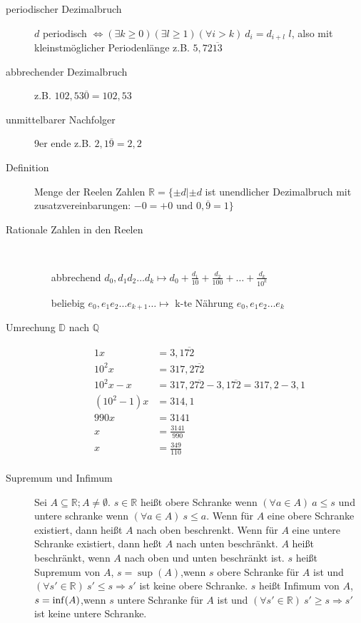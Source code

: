 \begin{description}
    \item[periodischer Dezimalbruch] $d$ periodisch
    $\Leftrightarrow (\exists k \geq 0)(\exists l \geq 1) (\forall i > k)\ d_i= d_{i + l}$ $l$, also mit kleinstmöglicher Periodenlänge z.B. $5{,}72\overline{13}$
    \item[abbrechender Dezimalbruch] z.B. $102{,}53\overline{0} = 102{,}53$
    \item[unmittelbarer Nachfolger] 9er ende z.B. $2{,}1\overline{9} = 2{,}2$
    \item[Definition] Menge der Reelen Zahlen $\mathbb{R} = \lbrace \pm d | \pm d $ ist unendlicher Dezimalbruch mit zusatzvereinbarungen: $ -0 = +0 \textrm{ und } 0{,}\overline{9} = 1 \rbrace$
    \item[Rationale Zahlen in den Reelen] \
    \begin{itemize}
        \item[abbrechend] $d_0{,}d_1 d_2 \dots d_k \longmapsto d_0 + \frac{d_1}{10}+\frac{d_2}{100} + \dots + \frac{d_k}{10^k}$
        \item[beliebig] $e_0{,}e_1 e_2 \dots e_{k + 1} \dots \longmapsto$ k-te Nährung $e_0{,}e_1 e_2 \dots e_k$
    \end{itemize}
    \item[Umrechung $\mathbb{D}$ nach $\mathbb{Q}$]
    \begin{alignat*}{1}
        x         & = 3{,}1\overline{72}                                          \\
        10^{2}x     & = 317{,}2\overline{72}                                        \\
        10^{2}x-x   & = 317{,}2\overline{72} - 3{,}1\overline{72} = 317{,}2 - 3{,}1 \\
        (10^2-1)x & = 314{,}1                                                     \\
        990x      & = 3141                                                        \\
        x         & = \frac{3141}{990}                                            \\
        x         & = \frac{349}{110}                                             \\
    \end{alignat*}
    \item[Supremum und Infimum] Sei $A \subseteq \mathbb{R}; A \not = \emptyset$. $s \in \mathbb{R}$ heißt obere Schranke wenn $(\forall a \in A)\ a \leq s$ und untere schranke wenn $(\forall a \in A)\ s \leq a$.
    Wenn für $A$ eine obere Schranke existiert, dann heißt $A$ nach oben beschrenkt.
    Wenn für $A$ eine untere Schranke existiert, dann heßt $A$ nach unten beschränkt. $A$ heißt beschränkt, wenn $A$ nach oben und unten beschränkt ist. $s$ heißt Supremum von $A$, $s = \sup(A)$,wenn $s$ obere Schranke für $A$ ist und $(\forall s' \in \mathbb{R})\ s' \leq s \Rightarrow s'$ ist keine obere Schranke. $s$ heißt Infimum von $A$, $s = \operatorname{inf}(A)$,wenn $s$ untere Schranke für $A$ ist und $(\forall s' \in \mathbb{R})\ s' \geq s \Rightarrow s'$ ist keine untere Schranke.


\end{description}
